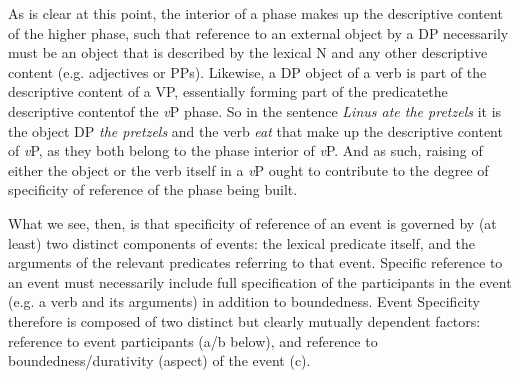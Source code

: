 
As is clear at this point, the interior of a phase makes up the descriptive content of the higher phase, such that reference to an external object by a DP necessarily must be an object that is described by the lexical N and any other descriptive content (e.g. adjectives or PPs). Likewise, a DP object of a verb is part of the descriptive content of a VP, essentially forming part of the predicate\textemdash the descriptive content\textemdash of the \textit{v}P phase. So in the sentence \textit{Linus ate the pretzels} it is the object DP \textit{the pretzels} and the verb \textit{eat} that make up the descriptive content of \textit{v}P, as they both belong to the phase interior of \textit{v}P. And as such, raising of either the object or the verb itself in a \textit{v}P ought to contribute to the degree of specificity of reference of the phase being built.%

What we see, then, is that specificity of reference of an event is governed by (at least) two distinct components of events: the lexical predicate itself, and the arguments of the relevant predicates referring to that event. Specific reference to an event must necessarily include full specification of the participants in the event (e.g. a verb and its arguments) in addition to boundedness. Event Specificity therefore is composed of two distinct but clearly mutually dependent factors: reference to event participants (a/b below), and reference to boundedness/durativity (aspect) of the event (c). 


